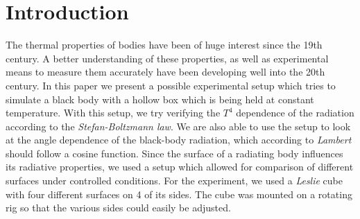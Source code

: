 \documentclass[a4paper,10pt,twocolumn]{article}
\begin{document}
    \section{Introduction}\label{sec:introdction}
    The thermal properties of bodies have been of huge interest since the 19th century.
    A better understanding of these properties, as well as experimental means to measure them accurately have been developing well into the 20th century.
    In this paper we present a possible experimental setup which tries to simulate a black body with a hollow box which is being held at constant temperature.
    With this setup, we try verifying the $T^4$ dependence of the radiation according to the \textit{Stefan-Boltzmann law}.
    We are also able to use the setup to look at the angle dependence of the black-body radiation, which according to \textit{Lambert} should follow a cosine function.
    Since the surface of a radiating body influences its radiative properties, we used a setup which allowed for comparison of different surfaces under controlled conditions.
    For the experiment, we used a \textit{Leslie} cube with four different surfaces on 4 of its sides.
    The cube was mounted on a rotating rig so that the various sides could easily be adjusted.
    
    
    
    
\end{document}
